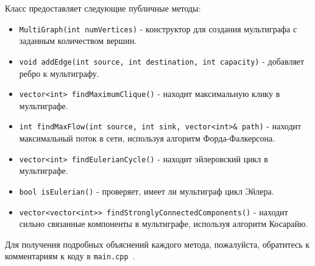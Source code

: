 \documentclass{article}
\begin{document}
Класс предоставляет следующие публичные методы:

\begin{itemize}
    \item \texttt{MultiGraph(int numVertices)} - конструктор для создания мультиграфа с заданным количеством вершин.
    \item \texttt{void addEdge(int source, int destination, int capacity)} - добавляет ребро к мультиграфу.
    \item \texttt{vector<int> findMaximumClique()} - находит максимальную клику в мультиграфе.
    \item \texttt{int findMaxFlow(int source, int sink, vector<int>\& path)} - находит максимальный поток в сети, используя алгоритм Форда-Фалкерсона.
    \item \texttt{vector<int> findEulerianCycle()} - находит эйлеровский цикл в мультиграфе.
    \item \texttt{bool isEulerian()} - проверяет, имеет ли мультиграф цикл Эйлера.
    \item \texttt{vector<vector<int>> findStronglyConnectedComponents()} - находит сильно связанные компоненты в мультиграфе, используя алгоритм Косарайю.
\end{itemize}

Для получения подробных объяснений каждого метода, пожалуйста, обратитесь к комментариям к коду в \texttt{main.cpp }.
\end{document}
